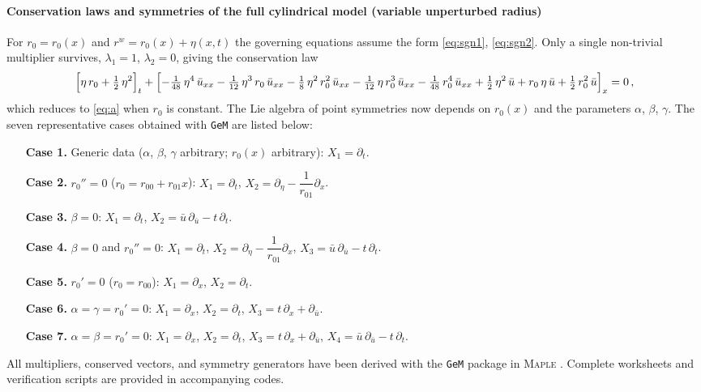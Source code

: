 \documentclass[alpha-refs, 12pt]{wiley-article}
\begin{document}
\paragraph{Conservation laws and symmetries of the full cylindrical model (variable unperturbed radius)}\label{par:variable_r0} For $r_{0}=r_{0}(x)$ and $r^{w}=r_{0}(x)+\eta(x,t)$ the governing equations assume the form \eqref{eq:sgn1}, \eqref{eq:sgn2}. Only a single non-trivial multiplier survives, $\lambda_{1}=1$, $\lambda_{2}=0$, giving the conservation law
\begin{equation}
  \Bigl[\eta\,r_{0}+\tfrac12\,\eta^{2}\Bigr]_{t}
  +\Bigl[
        -\tfrac1{48}\,\eta^{4}\,\bar{u}_{xx}
        -\tfrac1{12}\,\eta^{3}\,r_{0}\,\bar{u}_{xx}
        -\tfrac18\,\eta^{2}\,r_{0}^{2}\,\bar{u}_{xx}
        -\tfrac1{12}\,\eta\,r_{0}^{3}\,\bar{u}_{xx}
        -\tfrac1{48}\,r_{0}^{4}\,\bar{u}_{xx}
        \\[2pt]
        +\tfrac12\,\eta^{2}\,\bar{u}
        +r_{0}\,\eta\,\bar{u}
        +\tfrac12\,r_{0}^{2}\,\bar{u}
  \Bigr]_{x}=0\,,
\end{equation}
which reduces to \eqref{eq:a} when $r_{0}$ is constant. The Lie algebra of point symmetries now depends on $r_{0}(x)$ and the parameters $\alpha$, $\beta$, $\gamma$. The seven representative cases obtained with \texttt{GeM} are listed below:
\begin{itemize}
  \item[\textbf{Case 1.}]
    Generic data ($\alpha$, $\beta$, $\gamma$ arbitrary; $r_{0}(x)$ arbitrary):\;
    $X_{1}=\partial_{t}$.
  \item[\textbf{Case 2.}]
    $r_{0}''=0$ ($r_{0}=r_{00}+r_{01}x$):\;
    $X_{1}=\partial_{t}$,\;
    $X_{2}=\partial_{\eta}-\dfrac{1}{r_{01}}\partial_{x}$.
  \item[\textbf{Case 3.}]
    $\beta=0$:\;
    $X_{1}=\partial_{t}$,\;
    $X_{2}=\bar{u}\,\partial_{\bar{u}}-t\,\partial_{t}$.
  \item[\textbf{Case 4.}]
    $\beta=0$ and $r_{0}''=0$:\;
    $X_{1}=\partial_{t}$,\;
    $X_{2}=\partial_{\eta}-\dfrac{1}{r_{01}}\partial_{x}$,\;
    $X_{3}=\bar{u}\,\partial_{\bar{u}}-t\,\partial_{t}$.
  \item[\textbf{Case 5.}]
    $r_{0}'=0$ ($r_{0}=r_{00}$):\;
    $X_{1}=\partial_{x}$,\;
    $X_{2}=\partial_{t}$.
  \item[\textbf{Case 6.}]
    $\alpha=\gamma=r_{0}'=0$:\;
    $X_{1}=\partial_{x}$,\;
    $X_{2}=\partial_{t}$,\;
    $X_{3}=t\,\partial_{x}+\partial_{\bar{u}}$.
  \item[\textbf{Case 7.}]
    $\alpha=\beta=r_{0}'=0$:\;
    $X_{1}=\partial_{x}$,\;
    $X_{2}=\partial_{t}$,\;
    $X_{3}=t\,\partial_{x}+\partial_{\bar{u}}$,\;
    $X_{4}=\bar{u}\,\partial_{\bar{u}}-t\,\partial_{t}$.
  \end{itemize}
All multipliers, conserved vectors, and symmetry generators have been derived with the \texttt{GeM} package in \textsc{Maple} \cite{Cheviakov2007}. Complete worksheets and verification scripts are provided in accompanying codes.
\end{document}
